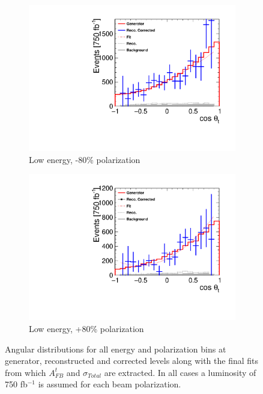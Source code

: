 \begin{figure}[]
\begin{subfigure}[]{0.5\linewidth}
    \includegraphics[width=0.99\linewidth]{TopAnalysis/figures/ThetaPlots_400GeVNeg.pdf} 
    \caption{Low energy, -80\% polarization} 
    \vspace{4ex}
  \end{subfigure}%
  \begin{subfigure}[]{0.5\linewidth}
    \centering
    \includegraphics[width=0.99\linewidth]{TopAnalysis/figures/ThetaPlots_400GeVPos.pdf} 
    \caption{Low energy, +80\% polarization} 
    \vspace{4ex}
  \end{subfigure}
  \caption[Final corrected angular distributions from which $A_{FB}^t$ and $\sigma_{Total}$ are extracted]{Angular distributions for all energy and polarization bins at generator, reconstructed and corrected levels along with the final fits from which $A_{FB}^t$ and $\sigma_{Total}$ are extracted. In all cases a luminosity of 750 fb$^{-1}$ is assumed for each beam polarization.}
  \label{fig:finalfits}
\end{figure}

